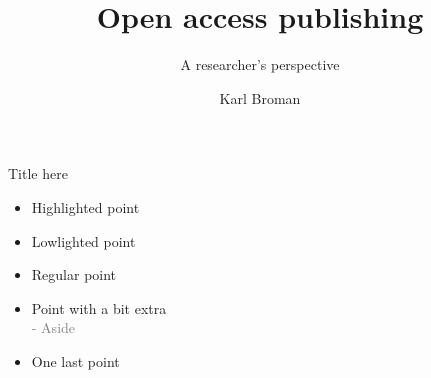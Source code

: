 \documentclass[12pt]{beamer}
\title{Open access publishing}
\subtitle{\textcolor{subtitle}{A researcher's perspective}}
\author{Karl Broman}
\institute{\textcolor{gray}{Biostatistics \& Medical Informatics \\[2pt] University of Wisconsin--Madison}}
\date{}
\begin{document}
{
\frame{\titlepage}
}



\begin{frame}{Title here}
\begin{itemize}
\item {\textcolor{hilight}{Highlighted point}}
\item {\textcolor{lolight}{Lowlighted point}}
\item Regular point
\item Point with a bit extra \\
\textcolor{gray}{\footnotesize - Aside}
\item One last point
\end{itemize}
\end{frame}
\end{document}
